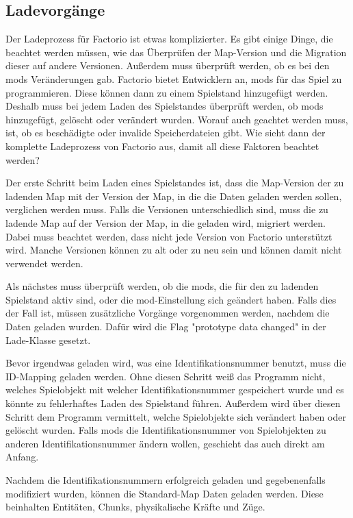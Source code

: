 \subsection{Ladevorgänge}
Der Ladeprozess für Factorio ist etwas komplizierter. Es gibt einige Dinge, die beachtet werden müssen, wie das Überprüfen der Map-Version und die Migration dieser auf andere Versionen. Außerdem muss überprüft werden, ob es bei den \acp{mod} Veränderungen gab. Factorio bietet Entwicklern an, \acp{mod} für das Spiel zu programmieren. Diese können dann zu einem Spielstand hinzugefügt werden. Deshalb muss bei jedem Laden des Spielstandes überprüft werden, ob \acp{mod} hinzugefügt, gelöscht oder verändert wurden. Worauf auch geachtet werden muss, ist, ob es beschädigte oder invalide Speicherdateien gibt.\cite{factorioFridayFacts270} 
Wie sieht dann der komplette Ladeprozess von Factorio aus, damit all diese Faktoren beachtet werden?

Der erste Schritt beim Laden eines Spielstandes ist, dass die Map-Version der zu ladenden Map mit der Version der Map, in die die Daten geladen werden sollen, verglichen werden muss. Falls die Versionen unterschiedlich sind, muss die zu ladende Map auf der Version der Map, in die geladen wird, migriert werden. Dabei muss beachtet werden, dass nicht jede Version von Factorio unterstützt wird. Manche Versionen können zu alt oder zu neu sein und können damit nicht verwendet werden.\cite{factorioGithubSaveLoad}

Als nächstes muss überprüft werden, ob die \acp{mod}, die für den zu ladenden Spielstand aktiv sind, oder die \ac{mod}-Einstellung sich geändert haben. Falls dies der Fall ist, müssen zusätzliche Vorgänge vorgenommen werden, nachdem die Daten geladen wurden. Dafür wird die Flag "prototype data changed" in der Lade-Klasse gesetzt.\cite{factorioGithubSaveLoad}

Bevor irgendwas geladen wird, was eine Identifikationsnummer benutzt, muss die ID-Mapping geladen werden. Ohne diesen Schritt weiß das Programm nicht, welches Spielobjekt mit welcher Identifikationsnummer gespeichert wurde und es könnte zu fehlerhaftes Laden des Spielstand führen. Außerdem wird über diesen Schritt dem Programm vermittelt, welche Spielobjekte sich verändert haben oder gelöscht wurden. Falls \acp{mod} die Identifikationsnummer von Spielobjekten zu anderen Identifikationsnummer ändern wollen, geschieht das auch direkt am Anfang.\cite{factorioGithubSaveLoad}

Nachdem die Identifikationsnummern erfolgreich geladen und gegebenenfalls modifiziert wurden, können die Standard-Map Daten geladen werden. Diese beinhalten Entitäten, Chunks, physikalische Kräfte und Züge.\cite{factorioGithubSaveLoad}

